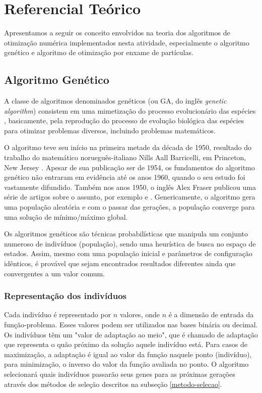 \documentclass[a4paper,12pt]{article}
\begin{document}
\section{Referencial Teórico}

Apresentamos a seguir os conceito envolvidos na teoria dos algoritmos de otimização numérica implementados nesta atividade, especialmente o algoritmo genético e algoritmo de otimização por enxame de partículas. 

\subsection{Algoritmo Genético}

A classe de algoritmos denominados genéticos (ou GA, do inglês \textit{genetic algorithm}) consistem em uma mimetização do processo evolucionário das espécies \cite{Linden:2008}, basicamente, pela reprodução do processo de evolução biológica das espécies para otimizar problemas diversos, incluindo problemas matemáticos. 

O algoritmo teve seu início na primeira metade da década de 1950, resultado do trabalho do matemático norueguês-italiano Nills Aall Barricelli, em Princeton, New Jersey \cite{KennedyEberhart:1995}. Apesar de sua publicação ser de 1954, os fundamentos do algoritmo genético não entraram em evidência até os anos 1960, quando o seu estudo foi vastamente difundido. Também nos anos 1950, o inglês Alex Fraser publicou uma série de artigos sobre o assunto, por exemplo \cite{Fraser:1957} e \cite{Fraser_etal:1970}. Genericamente, o algoritmo gera uma população aleatória e com o passar das gerações, a população converge para uma solução de mínimo/máximo global.

Os algoritmos genéticos são técnicas probabilísticas que manipula um conjunto numeroso de indivíduos (população), sendo uma heurística de busca no espaço de estados. Assim, mesmo com uma população inicial e parâmetros de configuração idênticos, é provável que sejam encontrados resultados diferentes ainda que convergentes a um valor comum.


\subsubsection{Representação dos indivíduos}

Cada indivíduo é representado por $n$ valores, onde $n$ é a dimensão de entrada da função-problema. Esses valores podem ser utilizados nas bases binária ou decimal. Os indivíduos têm um "valor de adaptação ao meio", que é chamado de adaptação que representa o quão próximo da solução aquele indivíduo está. Para casos de maximização, a adaptação é igual ao valor da função naquele ponto (indivíduo), para minimização, o inverso do valor da função avaliada no ponto. O algoritmo selecionará quais indivíduos passarão seus genes para as próximas gerações através dos métodos de seleção descritos na subseção \ref{metodo-selecao}. 
\end{document}
